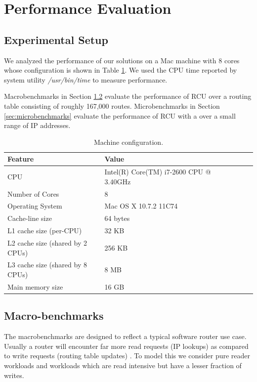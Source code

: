 \documentclass[a4paper,marginparwidth=50pt,marginparsep=10pt]{article}
\begin{document}
\section{Performance Evaluation}
\label{sec:perfeval}
\subsection{Experimental Setup}
We analyzed the performance of our solutions on a Mac machine with 8 cores whose configuration is shown in Table \ref{tbl:machinemac}.
We used the CPU time reported by system utility \emph{/usr/bin/time} to measure performance.

Macrobenchmarks in Section \ref{sec:macrobenchmarks} evaluate the performance of RCU over a routing table consisting of roughly 167,000 routes. Microbenchmarks in Section \ref{sec:microbenchmarks} evaluate the performance of RCU with a over a small range of IP addresses.

\begin{table}
\begin{center}
\begin{tabular}{|l|l|l|l|l|l|}
\hline Feature & Value\\
\hline CPU &Intel(R) Core(TM) i7-2600 CPU @ 3.40GHz\\
\hline Number of Cores & 8\\
\hline Operating System & Mac OS X 10.7.2 11C74\\
\hline Cache-line size & 64 bytes\\
\hline L1 cache size (per-CPU) & 32 KB\\
\hline L2 cache size (shared by 2 CPUs) & 256 KB\\
\hline L3 cache size (shared by 8 CPUs)& 8 MB\\
\hline Main memory size & 16 GB\\
\hline
\end{tabular}
\end{center}
\caption{Machine configuration.}
\label{tbl:machinemac}
\end{table}

\subsection{Macro-benchmarks}
\label{sec:macrobenchmarks}

The macrobenchmarks are designed to reflect a typical software router
use case. Usually a router will encounter far more read requests (IP
lookups) as compared to write requests (routing table updates) . To
model this we consider pure reader workloads and workloads which are
read intensive but have a lesser fraction of writes.\\
\end{document}
